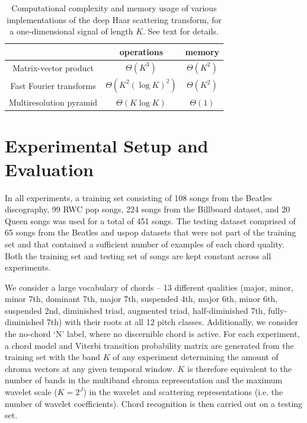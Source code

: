 \documentclass{article}
\makeatletter
\newcommand*{\ie}{i.e.\@\xspace}
\makeatother
\begin{document}
\begin{table}[t]
	\begin{center}
	\begin{tabular}{|c|cc|}
		\hline
		& operations & memory \\
		\hline
		Matrix-vector product & $\Theta(K^3)$ & $\Theta(K^2)$ \\
		Fast Fourier transforms & $\Theta(K^2 (\log K)^2)$ & $\Theta(K^2)$ \\
		Multiresolution pyramid & $\Theta(K \log K)$ & $\Theta(1)$ \\
		\hline		
	\end{tabular}
	\end{center}
	\protect\caption{Computational complexity and memory usage of various implementations
	of the deep Haar scattering transform, for a one-dimensional signal
	of length $K$. See text for details.
	\label{table:scattering-complexities}}
\end{table}


\section{Experimental Setup and Evaluation}\label{sec:experiment}

In all experiments, a training set consisting of 108 songs from the Beatles
discography, 99 RWC pop songs, 224 songs from the Billboard dataset, and 20 Queen songs was used for a total of 451 songs.
The testing dataset comprised of 65 songs from the Beatles and uspop datasets that were not part
of the training set and that contained a sufficient number of examples of each chord quality. 
Both the training set and testing set of songs are kept constant across all experiments.
	
We consider a large vocabulary of chords -- 13 different qualities (major, minor, minor 7th, dominant 7th, major 7th, suspended 4th, major 6th, minor 6th, suspended 2nd, diminished triad, augmented triad, half-diminished 7th, fully-diminished 7th) with their roots at all 12 pitch classes. Additionally, we consider the no-chord `N' label, where no discernible chord is active. For each experiment, a chord model and Viterbi transition probability matrix are generated from the 
training set with the band $K$ of any experiment determining the amount of chroma vectors at any given temporal
window. $K$ is therefore equivalent to the number of bands in the multiband chroma representation and the maximum wavelet scale ($K = 2^J$) in the wavelet and scattering representations (\ie the number of wavelet coefficients). Chord recognition is then carried out on a testing set.
\end{document}
